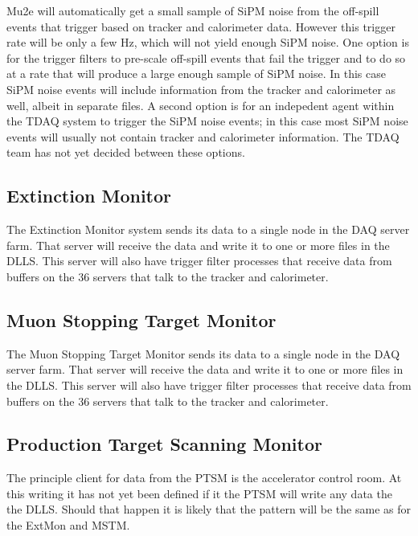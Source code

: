 Mu2e will automatically get a small sample of SiPM noise from the off-spill events
that trigger based on tracker and calorimeter data.
However this trigger rate will be only a few Hz, which will not yield enough SiPM noise.
One option is for the trigger filters to pre-scale off-spill events that fail the trigger
and to do so at a rate that will produce a large enough sample of SiPM noise.
In this case SiPM noise events will include information from the tracker and calorimeter as well,
albeit in separate files.
A second option is for an indepedent agent within the TDAQ system to trigger the SiPM noise events;
in this case most SiPM noise events will usually not contain tracker and calorimeter information.
The TDAQ team has not yet decided between these options.


\subsection{Extinction Monitor}
\label{ssec:ExtMon}

The Extinction Monitor system sends its data to a single node in the DAQ server farm.
That server will receive the data and write it to one or more files in
the DLLS.  This server will also have trigger filter processes that receive
data from buffers on the 36 servers that talk to the tracker and calorimeter.


\subsection{Muon Stopping Target Monitor}
\label{ssec:ExtMon}

The Muon Stopping Target Monitor sends its data to a single node in the DAQ server farm.
That server will receive the data and write it to one or more files in
the DLLS.  This server will also have trigger filter processes that receive
data from buffers on the 36 servers that talk to the tracker and calorimeter.

\subsection{Production Target Scanning Monitor}

The principle client for data from the PTSM is the accelerator control room.
At this writing it has not yet been defined if it the PTSM will write any data the the DLLS.
Should that happen it is likely that the pattern will be the same as for the ExtMon
and MSTM.


